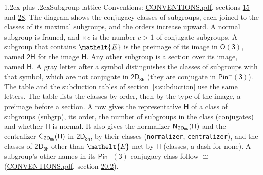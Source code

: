\documentclass[10pt,a4paper]{article}
\makeatletter
\renewcommand\section{\@startsection{section}{1}{\z@}{-3ex plus -1ex minus -.2ex}%
  {1.2ex plus .2ex}{\normalfont\large\sffamily\bfseries\color{parttitle}}}
\numberwithin{equation}{section}
\newcommand{\eltfont}[1]{{\let\sigma\eltsigma\mathelt{#1}}}
\newcommand{\grp}[1]{\mathsf{#1}}
\newcommand{\cls}[1]{\eltfont{#1}}
\newcommand{\elt}[1]{\eltfont{#1}}
\newcommand{\samecls}{\cong}
\newcommand{\barred}[1]{\bar{#1}}
\newcommand{\hairsp}{\mkern1mu}
\makeatother
\begin{document}
\section{Subgroup lattice}\label{s:subgroups}
Conventions: \href{../../CONVENTIONS.pdf}{CONVENTIONS.pdf}, sections \href{../../../rotation/CONVENTIONS.pdf\#conv.15}{15} and \href{../../CONVENTIONS.pdf\#conv.28}{28}.
The diagram shows the conjugacy classes of subgroups, each joined to the classes of its maximal subgroups, and the orders increase upward. \label{n:index.conjugates.c}\label{n:mark.conjugates}A normal subgroup is framed, and ${\times}c$ is the number $c > 1$ of conjugate subgroups. \label{n:group.H}A subgroup that contains $\elt{\barred{E}}$ is the preimage of its image in $\grp{O(3)}$, named $\grp{2H}$ for the image $\grp{H}$. Any other subgroup is a section over its image, named $\grp{H}$. A gray letter after a symbol distinguishes the classes of subgroups with that symbol, which are not conjugate in $\grp{2D_{8h}}$ (they are conjugate in \href{Pinminus3.pdf}{$\grp{Pin^{-}(3)}$}). The table and the subduction tables of section~\ref{s:subduction} use the same letters. The table lists the classes by order, then by the type of the image, a preimage before a section. \label{n:head.subgroup}\label{n:head.order}\label{n:head.conjugates}\label{n:head.normal}A row gives the representative $\grp{H}$ of a class of subgroups (subgrp), its order, the number of subgroups in the class (conjugates) and whether $\grp{H}$ is normal. \label{n:group.normalizer}\label{n:group.centralizer}\label{n:head.classes}It also gives the normalizer $\grp{N}_{\hairsp \grp{2D_{8h}}}(\grp{H})$ and the centralizer $\grp{C}_{\hairsp \grp{2D_{8h}}}(\grp{H})$ in $\grp{2D_{8h}}$, by their classes (\texttt{normalizer}, \texttt{centralizer}), and the classes of $\grp{2D_{8h}}$ other than $\cls{E}$ met by $\grp{H}$ (classes, a dash for none). A subgroup's other names in its \href{Pinminus3.pdf}{$\grp{Pin^{-}(3)}$}-conjugacy class follow $\samecls$ (\href{../../CONVENTIONS.pdf}{CONVENTIONS.pdf}, section \href{../../CONVENTIONS.pdf\#conv.20.2}{20.2}).
\end{document}
